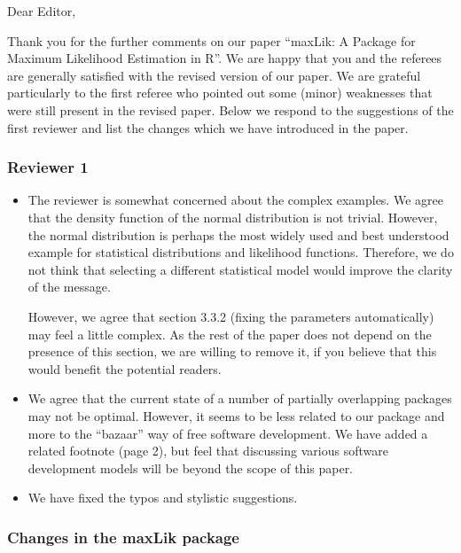 \documentclass[12pt,parskip=half]{scrartcl}
\begin{document}
Dear Editor,

\bigskip

Thank you for the further comments on our paper ``maxLik: A
Package for Maximum Likelihood Estimation in R''.
We are happy that you and the referees are generally satisfied
with the revised version of our paper.
We are grateful particularly to the first referee
who pointed out some (minor) weaknesses
that were still present in the revised paper.
Below we respond to the suggestions of the first reviewer
and list the changes which we have introduced in the paper.


\subsubsection*{Reviewer 1}

\begin{itemize}
\item The reviewer is somewhat concerned about the complex examples.
  We agree that the density function of the normal distribution is not trivial.
  However, the normal distribution is perhaps the most widely used and
  best understood example for statistical distributions and likelihood
  functions.
  Therefore, we do not think that selecting a different statistical model
  would improve the clarity of the message.

  However, we agree that section 3.3.2 (fixing the parameters
  automatically) may feel a little complex.  As the rest of the paper
  does not depend on the presence of this section, we are willing to
  remove it, if you believe that this would benefit the potential readers.
\item We agree that the current state of a number of partially
  overlapping packages may not be optimal.  However, it seems to be
  less related to our package and more to the ``bazaar'' way of free
  software development.  We have added a related footnote (page 2),
  but feel that discussing various software development models will be
  beyond the scope of this paper.
\item We have fixed the typos and stylistic suggestions.
\end{itemize}

\subsubsection*{Changes in the maxLik package}
\end{document}
